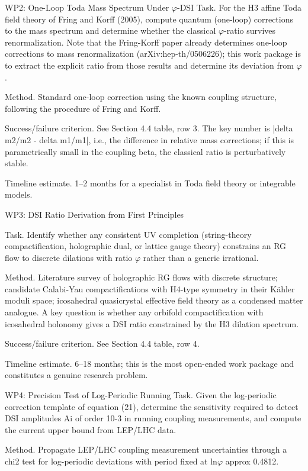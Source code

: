   WP2: One-Loop Toda Mass Spectrum Under $\varphi$-DSI
  Task. For the H3 affine Toda field theory of Fring and Korff (2005), compute quantum
  (one-loop) corrections to the mass spectrum and determine whether the classical
  $\varphi$-ratio survives renormalization. Note that the Fring-Korff paper already determines
  one-loop corrections to mass renormalization (arXiv:hep-th/0506226); this work
  package is to extract the explicit ratio from those results and determine its deviation
  from $\varphi$.

  Method. Standard one-loop correction using the known coupling structure, following
  the procedure of Fring and Korff.

  Success/failure criterion. See Section 4.4 table, row 3. The key number is |delta m2/m2
  - delta m1/m1|, i.e., the difference in relative mass corrections; if this is parametrically
  small in the coupling beta, the classical ratio is perturbatively stable.

  Timeline estimate. 1--2 months for a specialist in Toda field theory or integrable models.

  WP3: DSI Ratio Derivation from First Principles

  Task. Identify whether any consistent UV completion (string-theory compactification,
  holographic dual, or lattice gauge theory) constrains an RG flow to discrete dilations
  with ratio $\varphi$ rather than a generic irrational.

  Method. Literature survey of holographic RG flows with discrete structure; candidate
  Calabi-Yau compactifications with H4-type symmetry in their Kähler moduli space;
  icosahedral quasicrystal effective field theory as a condensed matter analogue. A key
  question is whether any orbifold compactification with icosahedral holonomy gives a
  DSI ratio constrained by the H3 dilation spectrum.

  Success/failure criterion. See Section 4.4 table, row 4.

  Timeline estimate. 6--18 months; this is the most open-ended work package and
  constitutes a genuine research problem.

  WP4: Precision Test of Log-Periodic Running
  Task. Given the log-periodic correction template of equation (21), determine the
  sensitivity required to detect DSI amplitudes Ai of order 10-3 in running coupling
  measurements, and compute the current upper bound from LEP/LHC data.

  Method. Propagate LEP/LHC coupling measurement uncertainties through a chi2 test
  for log-periodic deviations with period fixed at ln$\varphi$ approx 0.4812.

